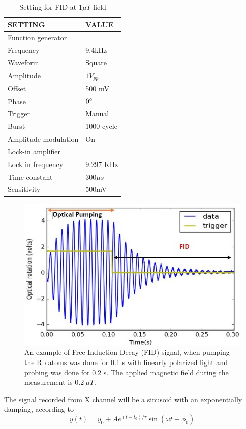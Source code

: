 \begin{table}[h]
\centering
\begin{tabular}{|l |l|}
\hline

\textbf{ SETTING}    & \textbf{VALUE} \\
\hline
Function generator &   \\
\hline
Frequency & 9.4kHz   \\

Waveform    &  Square  \\

Amplitude   &  $1V_{pp}$  \\
Offset  &       500 mV  \\
Phase       &    $0\degree$ \\
Trigger     &   Manual  \\
Burst       &    1000 cycle \\
Amplitude modulation & On \\
\hline
Lock-in amplifier &     \\
\hline
Lock in frequency     & 9.297 KHz \\
Time constant     &  $300\mu s$ \\
Sensitivity      &  500mV  \\
\hline
\end{tabular}
\caption{Setting for FID at $1\mu T$ field\label{table:FID setting}}
\end{table}
\begin{figure}[h]
\centering\includegraphics[width=0.55\linewidth]{figures/Capture2}
\caption{ An example of Free Induction Decay (FID) signal, when pumping the Rb atoms  was done for 0.1 s with linearly polarized light and probing was done for 0.2 s. The applied magnetic field during the measurement is $0.2~\mu T$. }
\end{figure}
The signal recorded  from X channel will be a sinusoid with an exponentially damping, according to   
  \begin{equation}
 y(t) = y_0 + A   e^{(t-t_0)/\tau}\sin(\omega t + \phi_0)\label{eq:decaying sinwave}
\end{equation}  

